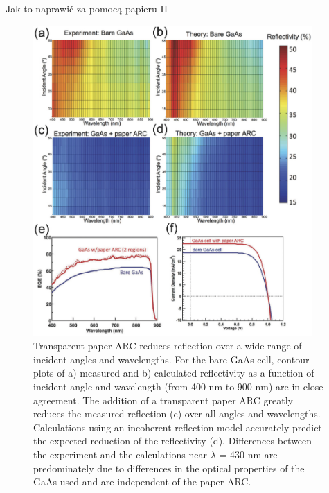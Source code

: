 \documentclass{beamer}
\begin{document}
\begin{frame}{Jak to naprawić za pomocą papieru II}
    \typeout{}

    \begin{figure}[h]
        \centering
                \begin{columns}
        \begin{column}{0.65\textwidth}
        \includegraphics[width=\textwidth]{fig2f.jpg}
        \end{column}
        \begin{column}{0.35\textwidth}
         \caption{
         Transparent paper ARC reduces reflection over a wide range of incident angles and wavelengths. For the bare GaAs cell, contour plots of a) measured and b) calculated reflectivity as a function of incident angle \typeout{} and wavelength (from 400 nm to 900 nm) are in close agreement. The addition of a transparent paper ARC greatly reduces the measured reflection (c) over all angles and wavelengths. Calculations using an incoherent reflection model accurately predict the expected reduction of the reflectivity (d). Differences between the experiment and the calculations near $\lambda$ = 430 nm are predominately due to differences in the optical properties of the GaAs used and are independent of the paper ARC. 
}
\end{column}
\end{columns}
\end{figure}
\end{frame}
\end{document}
